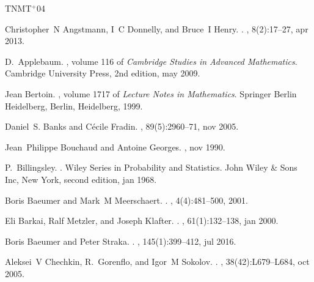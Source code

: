 \documentclass[a4paper,12pt]{elsarticle}
\numberwithin{equation}{section}
\theoremstyle{plain}
\theoremstyle{definition}
\theoremstyle{remark}
\numberwithin{equation}{section}
\newcommand{\1}{\mathbf 1}
\begin{document}
\newcommand{\etalchar}[1]{$^{#1}$}
\begin{thebibliography}{TNMT{\etalchar{+}}04}

Christopher~N Angstmann, I~C Donnelly, and Bruce~I Henry.
.
, 8(2):17--27, apr 2013.

D.~Applebaum.
, volume 116 of
  {\em Cambridge Studies in Advanced Mathematics}.
\newblock Cambridge University Press, 2nd edition, may 2009.

Jean Bertoin.
, volume 1717 of {\em
  Lecture Notes in Mathematics}.
\newblock Springer Berlin Heidelberg, Berlin, Heidelberg, 1999.

Daniel~S. Banks and C{\'{e}}cile Fradin.
, 89(5):2960--71, nov 2005.

Jean~Philippe Bouchaud and Antoine Georges.
, nov 1990.

P.~Billingsley.
.
\newblock Wiley Series in Probability and Statistics. John Wiley \& Sons Inc,
  New York, second edition, jan 1968.

Boris Baeumer and Mark~M Meerschaert.
.
, 4(4):481--500, 2001.

Eli Barkai, Ralf Metzler, and Joseph Klafter.
.
, 61(1):132--138, jan 2000.

Boris Baeumer and Peter Straka.
.
, 145(1):399--412, jul 2016.

Aleksei~V Chechkin, R.~Gorenflo, and Igor~M Sokolov.
.
, 38(42):L679--L684, oct 2005.


\end{thebibliography}
\end{document}
